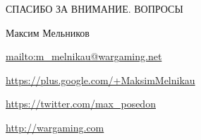 \documentclass[aspectratio=169]{beamer}
\begin{document}
{


\begin{frame}{СПАСИБО ЗА ВНИМАНИЕ. ВОПРОСЫ}
    \begin{block}{Максим Мельников}
    \par \url{mailto:m\_melnikau@wargaming.net}
    \par \url{https://plus.google.com/+MaksimMelnikau}
    \par \url{https://twitter.com/max\_posedon}
    \par \url{http://wargaming.com}
    \end{block}
\end{frame}
}
\end{document}
